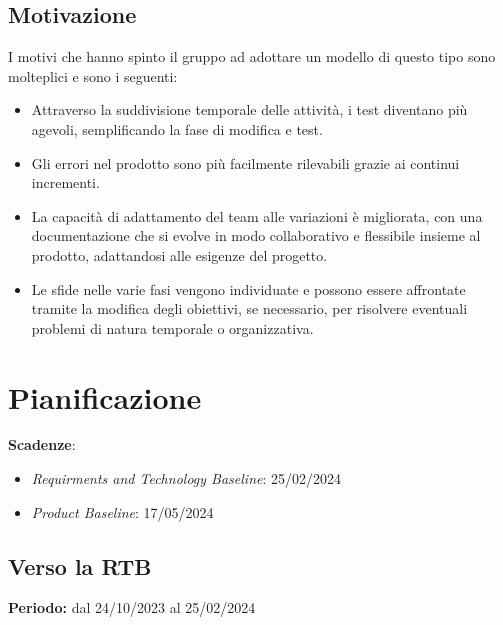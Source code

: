 \documentclass[5pt]{article}
\begin{document}
\subsection{Motivazione}
I motivi che hanno spinto il gruppo ad adottare un modello di questo tipo sono molteplici e sono i seguenti:
\begin{itemize}
    \item Attraverso la suddivisione temporale delle attività, i test diventano più agevoli, semplificando la fase di modifica e test.
    \item Gli errori nel prodotto sono più facilmente rilevabili grazie ai continui incrementi.
    \item La capacità di adattamento del team alle variazioni è migliorata, con una documentazione che si evolve in modo collaborativo e flessibile insieme al prodotto, adattandosi alle esigenze del progetto.
    \item Le sfide nelle varie fasi vengono individuate e possono essere affrontate tramite la modifica degli obiettivi, se necessario, per risolvere eventuali problemi di natura temporale o organizzativa.
\end{itemize}


\section{Pianificazione}
\textbf{Scadenze}:
\begin{itemize}
    \item \textit{Requirments and Technology Baseline}: 25/02/2024
    \item \textit{Product Baseline}: 17/05/2024
\end{itemize}

\subsection{Verso la RTB}
\textbf{Periodo:} dal 24/10/2023 al 25/02/2024
\end{document}
